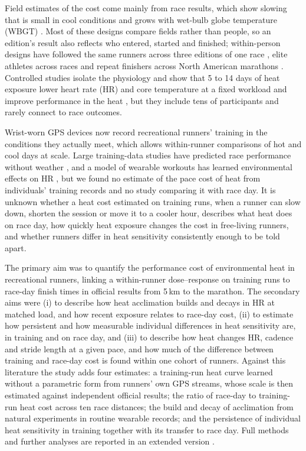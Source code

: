 \documentclass[12pt]{article}
\begin{document}
Field estimates of the cost come mainly from race results, which show slowing that is small in cool conditions and grows with wet-bulb globe temperature (WBGT) \cite{ely2007,elhelou2012,knechtle2019,mantzios2022,vernon2021}. Most of these designs compare fields rather than people, so an edition's result also reflects who entered, started and finished; within-person designs have followed the same runners across three editions of one race \cite{tan2022}, elite athletes across races \cite{wang2024} and repeat finishers across North American marathons \cite{oliveira2026}. Controlled studies isolate the physiology and show that 5 to 14 days of heat exposure lower heart rate (HR) and core temperature at a fixed workload and improve performance in the heat \cite{periard2015,tyler2016art,tyler2024,james2017}, but they include tens of participants and rarely connect to race outcomes.

Wrist-worn GPS devices now record recreational runners' training in the conditions they actually meet, which allows within-runner comparisons of hot and cool days at scale. Large training-data studies have predicted race performance without weather \cite{smyth2020,emig2020benchmark}, and a model of wearable workouts has learned environmental effects on HR \cite{nazaret2023}, but we found no estimate of the pace cost of heat from individuals' training records and no study comparing it with race day. It is unknown whether a heat cost estimated on training runs, when a runner can slow down, shorten the session or move it to a cooler hour, describes what heat does on race day, how quickly heat exposure changes the cost in free-living runners, and whether runners differ in heat sensitivity consistently enough to be told apart.

The primary aim was to quantify the performance cost of environmental heat in recreational runners, linking a within-runner dose--response on training runs to race-day finish times in official results from 5\,km to the marathon. The secondary aims were (i) to describe how heat acclimation builds and decays in HR at matched load, and how recent exposure relates to race-day cost, (ii) to estimate how persistent and how measurable individual differences in heat sensitivity are, in training and on race day, and (iii) to describe how heat changes HR, cadence and stride length at a given pace, and how much of the difference between training and race-day cost is found within one cohort of runners. Against this literature the study adds four estimates: a training-run heat curve learned without a parametric form from runners' own GPS streams, whose scale is then estimated against independent official results; the ratio of race-day to training-run heat cost across ten race distances; the build and decay of acclimation from natural experiments in routine wearable records; and the persistence of individual heat sensitivity in training together with its transfer to race day. Full methods and further analyses are reported in an extended version \cite{dunphy2026extended}.
\end{document}
